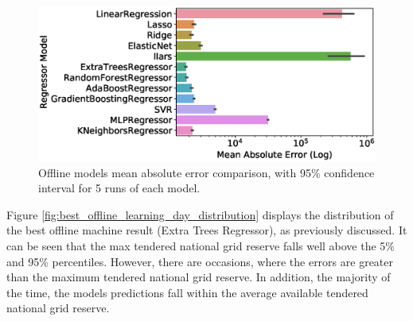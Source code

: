 \documentclass[final,3p,times,twocolumn,numbers]{elsarticle}
\begin{document}
\begin{figure}
\centering
\includegraphics[width=\columnwidth]{figures/results/offline_model_mae.eps}
\caption{Offline models mean absolute error comparison, with 95\% confidence interval for 5 runs of each model.}
\label{fig:beis_elecsim_historic_comparison}
\end{figure}



Figure \ref{fig:best_offline_learning_day_distribution} displays the distribution of the best offline machine result (Extra Trees Regressor), as previously discussed. It can be seen that the max tendered national grid reserve falls well above the 5\% and 95\% percentiles. However, there are occasions, where the errors are greater than the maximum tendered national grid reserve. In addition, the majority of the time, the models predictions fall within the average available tendered national grid reserve.
\end{document}
